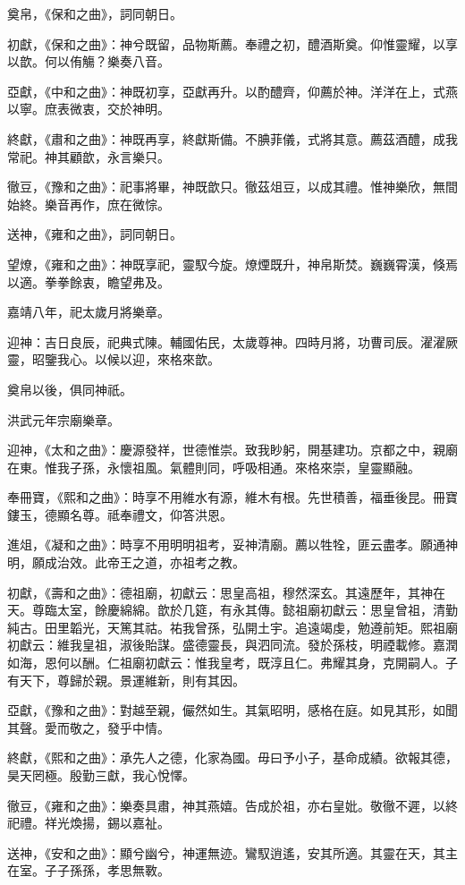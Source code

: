 奠帛，《保和之曲》，詞同朝日。

初獻，《保和之曲》：神兮既留，品物斯薦。奉禮之初，醴酒斯奠。仰惟靈耀，以享以歆。何以侑觴？樂奏八音。

亞獻，《中和之曲》：神既初享，亞獻再升。以酌醴齊，仰薦於神。洋洋在上，式燕以寧。庶表微衷，交於神明。

終獻，《肅和之曲》：神既再享，終獻斯備。不腆菲儀，式將其意。薦茲酒醴，成我常祀。神其顧歆，永言樂只。

徹豆，《豫和之曲》：祀事將畢，神既歆只。徹茲俎豆，以成其禮。惟神樂欣，無間始終。樂音再作，庶在微悰。

送神，《雍和之曲》，詞同朝日。

望燎，《雍和之曲》：神既享祀，靈馭今旋。燎煙既升，神帛斯焚。巍巍霄漢，倏焉以適。拳拳餘衷，瞻望弗及。

嘉靖八年，祀太歲月將樂章。

迎神：吉日良辰，祀典式陳。輔國佑民，太歲尊神。四時月將，功曹司辰。濯濯厥靈，昭鑒我心。以候以迎，來格來歆。

奠帛以後，俱同神祇。

洪武元年宗廟樂章。

迎神，《太和之曲》：慶源發祥，世德惟崇。致我眇躬，開基建功。京都之中，親廟在東。惟我子孫，永懷祖風。氣體則同，呼吸相通。來格來崇，皇靈顯融。

奉冊寶，《熙和之曲》：時享不用維水有源，維木有根。先世積善，福垂後昆。冊寶鏤玉，德顯名尊。祗奉禮文，仰答洪恩。

進俎，《凝和之曲》：時享不用明明祖考，妥神清廟。薦以牲牷，匪云盡孝。願通神明，願成治效。此帝王之道，亦祖考之教。

初獻，《壽和之曲》：德祖廟，初獻云：思皇高祖，穆然深玄。其遠歷年，其神在天。尊臨太室，餘慶綿綿。歆於几筵，有永其傳。懿祖廟初獻云：思皇曾祖，清勤純古。田里韜光，天篤其祜。祐我曾孫，弘開土宇。追遠竭虔，勉遵前矩。熙祖廟初獻云：維我皇祖，淑後貽謀。盛德靈長，與泗同流。發於孫枝，明禋載修。嘉潤如海，恩何以酬。仁祖廟初獻云：惟我皇考，既淳且仁。弗耀其身，克開嗣人。子有天下，尊歸於親。景運維新，則有其因。

亞獻，《豫和之曲》：對越至親，儼然如生。其氣昭明，感格在庭。如見其形，如聞其聲。愛而敬之，發乎中情。

終獻，《熙和之曲》：承先人之德，化家為國。毋曰予小子，基命成績。欲報其德，昊天罔極。殷勤三獻，我心悅懌。

徹豆，《雍和之曲》：樂奏具肅，神其燕嬉。告成於祖，亦右皇妣。敬徹不遲，以終祀禮。祥光煥揚，錫以嘉祉。

送神，《安和之曲》：顯兮幽兮，神運無迹。鸞馭逍遙，安其所適。其靈在天，其主在室。子子孫孫，孝思無斁。

